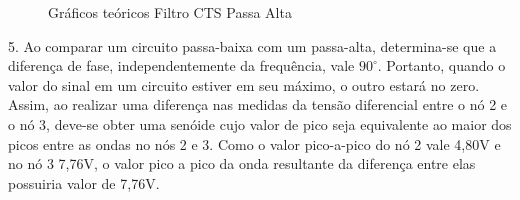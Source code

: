 \documentclass[a4paper]{article} %
\begin{document}
\begin{figure}[h!]
\begin{centering}
\par\end{centering}
\caption{Gráficos teóricos Filtro CTS Passa Alta \label{fig:teo_high}}
\end{figure}

\newpage
5. Ao comparar um circuito passa-baixa com um passa-alta, determina-se que a diferença de fase, independentemente da frequência, vale $90^{\circ}$.
Portanto, quando o valor do sinal em um circuito estiver em seu máximo, o outro estará no zero. Assim, ao realizar uma diferença nas medidas da tensão diferencial entre o nó 2 e o nó 3, deve-se obter uma senóide cujo valor de pico seja equivalente ao maior dos picos entre as ondas no nós 2 e 3. Como o valor pico-a-pico do nó 2 vale 4,80V e no nó 3 7,76V, o valor pico a pico da onda resultante da diferença entre elas possuiria valor de 7,76V.
\end{document}
